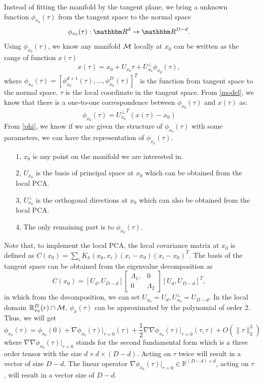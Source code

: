 \documentclass[aos,preprint]{imsart}
\theoremstyle{remark}
\begin{document}
 Instead of fitting the manifold by the tangent plane, we bring a unknown function $\phi_{x_0}(\tau)$ from the tangent space to the normal space
 \[
 \phi_{x_0}(\tau): {\mathbbm R}^d \rightarrow {\mathbbm R}^{D-d}.
 \] 
 Using  $\phi_{x_0}(\tau)$, we know any manifold $\cal M$ locally at $x_0$ can be written as the range of  function   $x(\tau)$
  \begin{equation}\label{model}
  x (\tau)=  x_0 + U_{x_0} \tau+ U_{x_0}^{\perp} \phi_{x_0} (\tau),
  \end{equation}
where $\phi_{x_0}(\tau)=[\phi_{x_0}^{d+1}(\tau),...,\phi_{x_0}^{D}(\tau)]^T$  is the function from tangent space to the normal space. $\tau$ is the local coordinate in the tangent space.
From \eqref{model}, we know that there is a one-to-one correspondence between $\phi_{x_0} (\tau)$ and $x(\tau)$ as: %
\begin{equation}\label{phi}
\phi_{x_0}(\tau) = {U_{x_0}^{\perp}}^{T}(x(\tau)-x_0)
\end{equation}
From \eqref{phi}, we know if we are given the structure of $\phi_{x_0}(\tau)$ with some parameters, we can have the representation of $\phi_{x_0}(\tau)$.
\begin{itemize}
\item[1,]  $x_0$ is any point on the manifold we are interested in.
\item[2,]  $U_{x_0}$ is the basis of principal space at $x_0$ which can be obtained from the local PCA. 
\item[3,]  $U_{x_0}^{\perp}$ is the orthogonal directions at $x_0$ which can also be obtained from the local PCA.
\item[4,]  The only remaining part is to  $\phi_{x_0} (\tau)$.
\end{itemize}

Note that, to implement the local PCA, the local covariance matrix at $x_0$ is defined as $C(x_0) = \sum_i K_h(x_0,x_i) (x_i-x_0)(x_i-x_0)^T$. The basis of the tangent space can be obtained from the eigenvalue decomposition as
\[
C(x_0) = [U_d , U_{D-d}] 
\left[
\begin{array}{cc}
\Lambda_1,& 0\\
0& \Lambda_2
\end{array}\right]
 [U_d , U_{D-d}]^T,
\]
in which from the decomposition, we can set $U_{x_0} = U_d, U_{x_0}^\perp = U_{D-d}$. In the local domain ${\mathbb R}_{x_0}^D (r)\cap \cal M$,  $\phi_x(\tau)$ can be approximated by the polynomial of order 2. Thus, we will get
\begin{equation}\label{app_phi}
\phi_{x_0}(\tau) = \phi_{x_0}(0)+ \nabla {\phi_{x_0}}(\tau)|_{\tau=0}(\tau)+ \frac{1}{2}{\nabla\nabla\phi_{x_0}(\tau)|_{\tau=0}}(\tau, \tau)+O(\|\tau\|_2^3)
\end{equation}
where ${\nabla\nabla\phi_{x_0}(\tau)|_{\tau=0}}$ stands for the second fundamental form which is a three order tensor with the size $ d\times d\times (D-d)$. Acting on $\tau$ twice will result in a vector of size $D-d$.  The linear operator  $\nabla {\phi_{x_0}}(\tau)|_{\tau=0}\in \mathbb{R}^{{(D-d)}\times d}$,  acting on $\tau$, will result in a vector size of $D-d$.
\end{document}
